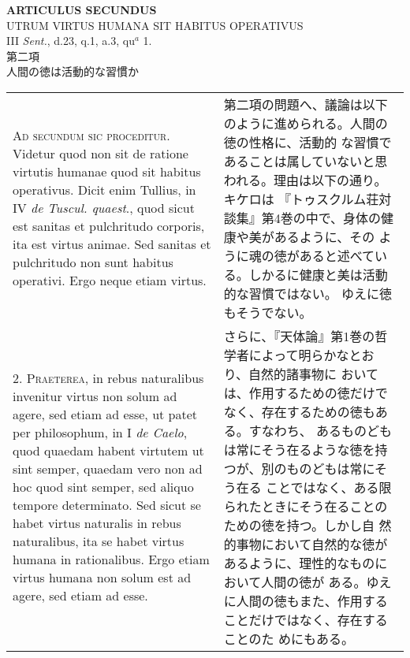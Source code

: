 \documentclass[10pt]{jsarticle}
\begin{document}
\newpage




\begin{center}
{\Large {\bf ARTICULUS SECUNDUS}}\\
{\large UTRUM VIRTUS HUMANA SIT HABITUS OPERATIVUS}\\
{\footnotesize III {\itshape Sent.}, d.23, q.1, a.3, qu$^{a}$ 1.}\\
{\Large 第二項\\人間の徳は活動的な習慣か}
\end{center}

\begin{longtable}{p{21em}p{21em}}

{\scshape Ad secundum sic proceditur}. Videtur quod non sit de ratione
virtutis humanae quod sit habitus operativus. Dicit enim Tullius, in
IV {\itshape de Tuscul. quaest}., quod sicut est sanitas et
pulchritudo corporis, ita est virtus animae. Sed sanitas et
pulchritudo non sunt habitus operativi. Ergo neque etiam virtus.

&

第二項の問題へ、議論は以下のように進められる。人間の徳の性格に、活動的
な習慣であることは属していないと思われる。理由は以下の通り。キケロは
『トゥスクルム荘対談集』第4巻の中で、身体の健康や美があるように、その
ように魂の徳があると述べている。しかるに健康と美は活動的な習慣ではない。
ゆえに徳もそうでない。


\\



2. {\scshape Praeterea}, in rebus naturalibus invenitur virtus non
solum ad agere, sed etiam ad esse, ut patet per philosophum, in I
{\itshape de Caelo}, quod quaedam habent virtutem ut sint semper,
quaedam vero non ad hoc quod sint semper, sed aliquo tempore
determinato. Sed sicut se habet virtus naturalis in rebus naturalibus,
ita se habet virtus humana in rationalibus. Ergo etiam virtus humana
non solum est ad agere, sed etiam ad esse.

&

さらに、『天体論』第1巻の哲学者によって明らかなとおり、自然的諸事物に
おいては、作用するための徳だけでなく、存在するための徳もある。すなわち、
あるものどもは常にそう在るような徳を持つが、別のものどもは常にそう在る
ことではなく、ある限られたときにそう在ることのための徳を持つ。しかし自
然的事物において自然的な徳があるように、理性的なものにおいて人間の徳が
ある。ゆえに人間の徳もまた、作用することだけではなく、存在することのた
めにもある。


\end{longtable}
\end{document}
